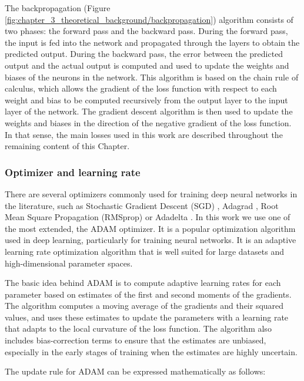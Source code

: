 The backpropagation (Figure \ref{fig:chapter_3_theoretical_background/backpropagation}) algorithm consists of two phases: the forward pass and the backward pass. During the forward pass, the input is fed into the network and propagated through the layers to obtain the predicted output. During the backward pass, the error between the predicted output and the actual output is computed and used to update the weights and biases of the neurons in the network. This algorithm is based on the chain rule of calculus, which allows the gradient of the loss function with respect to each weight and bias to be computed recursively from the output layer to the input layer of the network. The gradient descent algorithm is then used to update the weights and biases in the direction of the negative gradient of the loss function. In that sense, the main losses used in this work are described throughout the remaining content of this Chapter.

\subsubsection{Optimizer and learning rate}
\label{subsubsec:3_optimizer_and_lr}

There are several optimizers commonly used for training deep neural networks in the literature, such as Stochastic Gradient Descent (SGD) \cite{robbins1951stochastic}, Adagrad \cite{duchi2011adaptive}, Root Mean Square Propagation (RMSprop) \cite{zou2019sufficient} or Adadelta \cite{zeiler2012adadelta}. In this work we use one of the most extended, the \ac{ADAM} \cite{kingma2014adam} optimizer. It is a popular optimization algorithm used in deep learning, particularly for training neural networks. It is an adaptive learning rate optimization algorithm that is well suited for large datasets and high-dimensional parameter spaces.

The basic idea behind \ac{ADAM} is to compute adaptive learning rates for each parameter based on estimates of the first and second moments of the gradients. The algorithm computes a moving average of the gradients and their squared values, and uses these estimates to update the parameters with a learning rate that adapts to the local curvature of the loss function. The algorithm also includes bias-correction terms to ensure that the estimates are unbiased, especially in the early stages of training when the estimates are highly uncertain.

The update rule for \ac{ADAM} can be expressed mathematically as follows:

